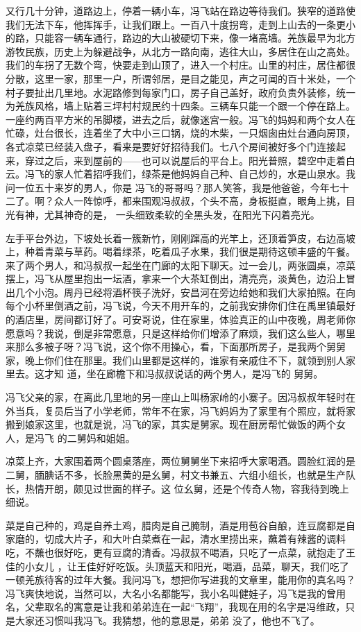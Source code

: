\documentclass{article}
\begin{document}
又行几十分钟，道路边上，停着一辆小车，冯飞站在路边等待我们。狭窄的道路使我们无法下车，他挥挥手，让我们跟上。一百八十度拐弯，走到上山去的一条更小的路，只能容一辆车通行，路边的大山被硬切下来，像一堵高墙。羌族最早为北方游牧民族，历史上为躲避战争，从北方一路向南，逃往大山，多居住在山之高处。我们的车拐了无数个弯，快要走到山顶了，进入一个村庄。山里的村庄，居住都很分散，这里一家，那里一户，所谓邻居，是目之能见，声之可闻的百十米处，一个村子要扯出几里地。水泥路修到每家门口，房子自己盖好，政府负责外装修，统一为羌族风格，墙上贴着三坪村村规民约十四条。三辆车只能一个跟一个停在路上。一座约两百平方米的吊脚楼，进去之后，就像迷宫一般。冯飞的妈妈和两个女人在忙碌，灶台很长，连着坐了大中小三口锅，烧的木柴，一只烟囱由灶台通向房顶，各式凉菜已经装入盘子，看来是要好好招待我们。七八个房间被好多个门连接起来，穿过之后，来到屋前的——也可以说屋后的平台上。阳光普照，碧空中走着白云。冯飞的家人忙着招呼我们，绿茶是他妈妈自己种、自己炒的，水是山泉水。我问一位五十来岁的男人，你是
\newpage
冯飞的哥哥吗？那人笑答，我是他爸爸，今年七十二了。啊？众人一阵惊呼，都来围观冯叔叔，个头不高，身板挺直，眼角上挑，目光有神，尤其神奇的是，
一头细致柔软的全黑头发，在阳光下闪着亮光。 

左手平台外边，下坡处长着一簇新竹，刚刚蹿高的光竿上，还顶着笋皮，右边高坡上，种着青菜与草药。喝着绿茶，吃着瓜子水果，我们很是期待这顿丰盛的午餐。来了两个男人，和冯叔叔一起坐在门廊的太阳下聊天。过一会儿，两张圆桌，凉菜摆上，冯飞从屋里抱出一坛酒，拿来一个大茶缸倒出，清亮亮，淡黄色，边沿上冒出几个小泡。周丹已经将酒杯筷子洗好，安昌河在旁边给她和我们大家拍照。在向每个小杯里倒酒之前，冯飞说，今天不用开车的，之前我安排你们住在禹里镇最好的酒店里，房间都订好了。可安哥说，住在家里，体验真正的山中夜晚，周老师你愿意吗？我说，倒是非常愿意，只是这样给你们增添了麻烦，我们这么些人，哪里来那么多被子呀？冯飞说，这个你不用操心，看，下面那所房子，是我两个舅舅家，晚上你们住在那里。我们山里都是这样的，谁家有亲戚住不下，就领到别人家里去。这才知
\newpage
道，坐在廊檐下和冯叔叔说话的两个男人，是冯飞的
舅舅。 

冯飞父亲的家，在离此几里地的另一座山上叫杨家岭的小寨子。因冯叔叔年轻时在外当兵，复员后当了小学老师，常年不在家，冯飞妈妈为了家里有个照应，就将家搬到娘家这里，也就是说，冯飞的家，其实是舅家。现在厨房帮忙做饭的两个女人，是冯飞
的二舅妈和姐姐。 

凉菜上齐，大家围着两个圆桌落座，两位舅舅坐下来招呼大家喝酒。圆脸红润的是二舅，腼腆话不多，长脸黑黄的是幺舅，村文书兼五、六组小组长，也就是生产队长，热情开朗，颇见过世面的样子。这
位幺舅，还是个传奇人物，容我待到晚上细说。 

菜是自己种的，鸡是自养土鸡，腊肉是自己腌制，酒是用苞谷自酿，连豆腐都是自家磨的，切成大片子，和大叶白菜煮在一起，清水里捞出来，蘸着有辣酱的调料吃，不蘸也很好吃，更有豆腐的清香。冯叔叔不喝酒，只吃了一点菜，就抱走了王佳的小女儿
\newpage
，让王佳好好吃饭。头顶蓝天和阳光，喝酒，品菜，聊天，我们吃了一顿羌族待客的过年大餐。我问冯飞，想把你写进我的文章里，能用你的真名吗？冯飞爽快地说，当然可以，大名小名都能写，我小名叫健娃子，冯飞是我的曾用名，父辈取名的寓意是让我和弟弟连在一起“飞翔”，我现在用的名字是冯维政，只是大家还习惯叫我冯飞。我猜想，他的意思是，弟弟
没了，他也不飞了。 
\end{document}
